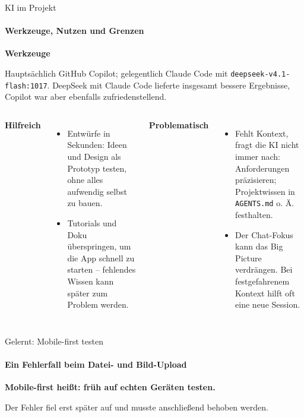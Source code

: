\documentclass[aspectratio=169,11pt]{beamer}
\begin{document}
\begin{frame}{KI im Projekt}
  \framesubtitle{Werkzeuge, Nutzen und Grenzen}
  {\large\bfseries\color{Akzent}Werkzeuge}
  \vspace{0.15cm}

  \small
  Hauptsächlich GitHub Copilot; gelegentlich Claude Code mit
  \texttt{deepseek-v4.1-flash:1017}. DeepSeek mit Claude Code lieferte insgesamt
  bessere Ergebnisse, Copilot war aber ebenfalls zufriedenstellend.

  \vspace{0.35cm}
  \begin{columns}[T,onlytextwidth]
      {\large\bfseries\color{Akzent}Hilfreich}
      \small
      \begin{itemize}
        \item Entwürfe in Sekunden: Ideen und Design als Prototyp testen, ohne alles aufwendig selbst zu bauen.
        \item Tutorials und Doku überspringen, um die App schnell zu starten -- fehlendes Wissen kann später zum Problem werden.
      \end{itemize}
      {\large\bfseries\color{Akzent}Problematisch}
      \small
      \begin{itemize}
        \item Fehlt Kontext, fragt die KI nicht immer nach: Anforderungen präzisieren; Projektwissen in \texttt{AGENTS.md} o. Ä. festhalten.
        \item Der Chat-Fokus kann das Big Picture verdrängen. Bei festgefahrenem Kontext hilft oft eine neue Session.
      \end{itemize}
  \end{columns}
\end{frame}

\begin{frame}{Gelernt: Mobile-first testen}
  \framesubtitle{Ein Fehlerfall beim Datei- und Bild-Upload}
  \centering

  \vspace{0.7cm}
  {\Large\bfseries Mobile-first heißt: früh auf echten Geräten testen.}

  \vspace{0.2cm}
  {\small Der Fehler fiel erst später auf und musste anschließend behoben werden.}
\end{frame}
\end{document}
